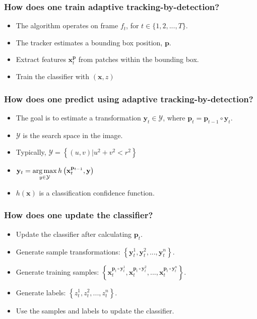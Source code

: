 \begin{frame}
    \frametitle{How does one train adaptive tracking-by-detection?}
    \begin{itemize}
        \item The algorithm operates on frame \(f_t\), for \(t \in \{1, 2, ..., T\}\).
        \item The tracker estimates a bounding box position, \(\mathbf{p}\).
        \item Extract features \(\mathbf{x}_t^\mathbf{p}\) from patches within the bounding box.
        \item Train the classifier with \((\mathbf{x}, z)\)
    \end{itemize}
\end{frame}

\begin{frame}
    \frametitle{How does one predict using adaptive tracking-by-detection?}
    \begin{itemize}
        \item The goal is to estimate a transformation \(\mathbf{y}_t \in
            \mathcal{Y}\), where \(\mathbf{p}_t = \mathbf{p}_{t-1} \circ \mathbf{y}_t\).
        \item \(\mathcal{Y}\) is the search space in the image.
        \item Typically, \(\mathcal{Y} = \left\{ (u,v) | u^2 + v^2 < r^2 \right \}\)
        \item<2-> \(\mathbf{y}_t = \operatorname*{arg\,max}\limits_{y \in \mathcal{Y}} h \left(
            \mathbf{x}_t^{\mathbf{p}_{t-1}}, \mathbf{y} \right)\)
        \item<2-> \(h(\mathbf{x})\) is a classification confidence function.
    \end{itemize}
\end{frame}

\begin{frame}
    \frametitle{How does one update the classifier?}

    \begin{itemize}
        \item Update the classifier after calculating \(\mathbf{p}_t\).
        \item Generate sample transformations: \(\left\{ \mathbf{y}_t^1,
            \mathbf{y}_t^2, ..., \mathbf{y}_t^n \right\}\).
        \item Generate training samples: \(\left\{
                \mathbf{x}_t^{\mathbf{p}_t \circ \mathbf{y}_t^1},
                \mathbf{x}_t^{\mathbf{p}_t \circ \mathbf{y}_t^2}, ...,
                \mathbf{x}_t^{\mathbf{p}_t \circ \mathbf{y}_t^n} \right\}\).
        \item Generate labels: \(\left\{ z_t^1, z_t^2, ..., z_t^n \right\}\).
        \item Use the samples and labels to update the classifier.
    \end{itemize}
\end{frame}

